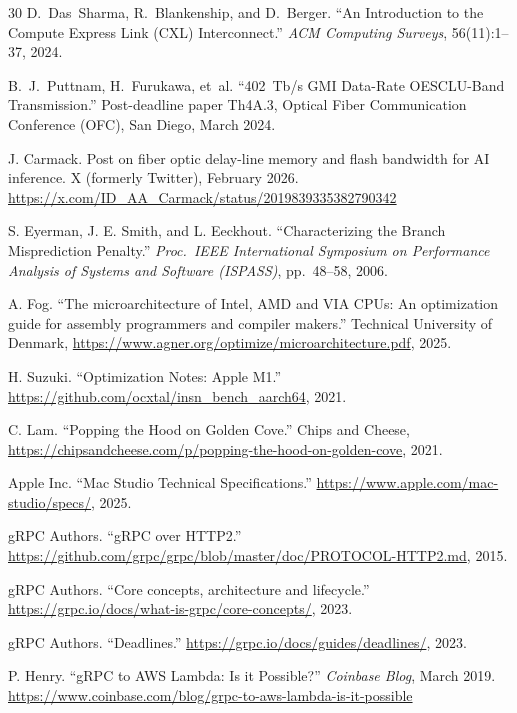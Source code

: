 \documentclass[10pt,onecolumn]{article}
\begin{document}
\begin{thebibliography}{30}
D.~Das~Sharma, R.~Blankenship, and D.~Berger. ``An Introduction to the Compute Express Link (CXL) Interconnect.'' \textit{ACM Computing Surveys}, 56(11):1--37, 2024.

B.~J.~Puttnam, H.~Furukawa, et~al. ``402~Tb/s GMI Data-Rate OESCLU-Band Transmission.'' Post-deadline paper Th4A.3, Optical Fiber Communication Conference (OFC), San Diego, March 2024.

J. Carmack. Post on fiber optic delay-line memory and flash bandwidth for AI inference. X (formerly Twitter), February 2026. \url{https://x.com/ID_AA_Carmack/status/2019839335382790342}

S. Eyerman, J. E. Smith, and L. Eeckhout. ``Characterizing the Branch Misprediction Penalty.'' \textit{Proc.\ IEEE International Symposium on Performance Analysis of Systems and Software (ISPASS)}, pp.\ 48--58, 2006.

A. Fog. ``The microarchitecture of Intel, AMD and VIA CPUs: An optimization guide for assembly programmers and compiler makers.'' Technical University of Denmark, \url{https://www.agner.org/optimize/microarchitecture.pdf}, 2025.

H. Suzuki. ``Optimization Notes: Apple M1.'' \url{https://github.com/ocxtal/insn_bench_aarch64}, 2021.

C. Lam. ``Popping the Hood on Golden Cove.'' Chips and Cheese, \url{https://chipsandcheese.com/p/popping-the-hood-on-golden-cove}, 2021.

Apple Inc. ``Mac Studio Technical Specifications.'' \url{https://www.apple.com/mac-studio/specs/}, 2025.


gRPC Authors. ``gRPC over HTTP2.'' \url{https://github.com/grpc/grpc/blob/master/doc/PROTOCOL-HTTP2.md}, 2015.

gRPC Authors. ``Core concepts, architecture and lifecycle.'' \url{https://grpc.io/docs/what-is-grpc/core-concepts/}, 2023.

gRPC Authors. ``Deadlines.'' \url{https://grpc.io/docs/guides/deadlines/}, 2023.

P. Henry. ``gRPC to AWS Lambda: Is it Possible?'' \textit{Coinbase Blog}, March 2019. \url{https://www.coinbase.com/blog/grpc-to-aws-lambda-is-it-possible}


\end{thebibliography}
\end{document}
